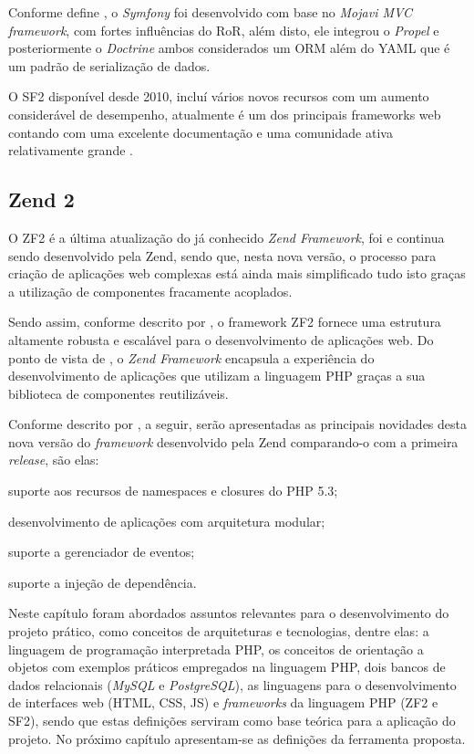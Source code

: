 Conforme define
, o
\textit{Symfony} foi desenvolvido com base no \textit{Mojavi MVC framework},
com fortes influências do \ac{RoR}, além disto, ele integrou o \textit{Propel} e
posteriormente o \textit{Doctrine} ambos considerados um \ac{ORM} além do
\ac{YAML} que é um padrão de serialização de dados.

O \ac{SF2} disponível desde 2010, incluí vários novos recursos com um aumento
considerável de desempenho, atualmente é um dos principais frameworks web
contando com uma excelente documentação e uma comunidade ativa relativamente
grande \cite{buildingPHPApplicationsWithSymfonyCakePHPAndZendFramework}.

\subsection{Zend 2}

O \ac{ZF2} é a última atualização do já conhecido \textit{Zend
Framework}, foi e continua sendo desenvolvido pela \acs{Zend}, sendo que, nesta
nova versão, o processo para criação de aplicações web complexas está ainda mais
simplificado tudo isto graças a utilização de componentes fracamente acoplados.

Sendo assim, conforme descrito por
, o framework \acs{ZF2}
fornece uma estrutura altamente robusta e escalável para o desenvolvimento de 
aplicações web. Do ponto de vista de
, o 
\textit{Zend Framework} encapsula a experiência do desenvolvimento de aplicações
que utilizam a linguagem \acs{PHP} graças a sua biblioteca de componentes 
reutilizáveis.

Conforme descrito por , a
seguir, serão apresentadas as principais novidades desta nova versão do 
\textit{framework} desenvolvido pela \acs{Zend} comparando-o com a primeira
\textit{release}, são elas:

\begin{alineas}
    \item suporte aos recursos de namespaces e closures do \acs{PHP} 5.3;
    \item desenvolvimento de aplicações com arquitetura modular;
    \item suporte a gerenciador de eventos;
    \item suporte a injeção de dependência.
\end{alineas}

Neste capítulo foram abordados assuntos relevantes para o
desenvolvimento do projeto prático, como conceitos de arquiteturas e
tecnologias, dentre elas: a linguagem de programação interpretada \acs{PHP},
os conceitos de orientação a objetos com exemplos práticos empregados na
linguagem \acs{PHP}, dois bancos de dados relacionais (\textit{MySQL} e
\textit{PostgreSQL}), as linguagens para o desenvolvimento de interfaces web
(\acs{HTML}, \acs{CSS}, \acs{JS}) e \textit{frameworks} da linguagem
\acs{PHP}  (\acs{ZF2} e \acs{SF2}), sendo que estas definições
serviram como base teórica para a aplicação do projeto. No próximo capítulo 
apresentam-se as definições da ferramenta proposta.
